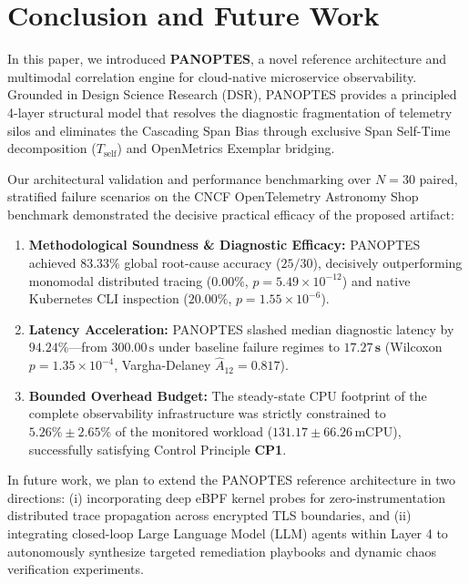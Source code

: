 \section{Conclusion and Future Work}
\label{sec:conclusion}

In this paper, we introduced \textbf{PANOPTES}, a novel reference architecture and multimodal correlation engine for cloud-native microservice observability. Grounded in Design Science Research (DSR), PANOPTES provides a principled 4-layer structural model that resolves the diagnostic fragmentation of telemetry silos and eliminates the Cascading Span Bias through exclusive Span Self-Time decomposition ($T_{\text{self}}$) and OpenMetrics Exemplar bridging.

Our architectural validation and performance benchmarking over $N=30$ paired, stratified failure scenarios on the CNCF OpenTelemetry Astronomy Shop benchmark demonstrated the decisive practical efficacy of the proposed artifact:
\begin{enumerate}[leftmargin=1.2em, itemsep=2pt, topsep=3pt]
    \item \textbf{Methodological Soundness \& Diagnostic Efficacy:} PANOPTES achieved $\mathbf{83.33\%}$ global root-cause accuracy ($25/30$), decisively outperforming monomodal distributed tracing ($0.00\%$, $p = 5.49 \times 10^{-12}$) and native Kubernetes CLI inspection ($20.00\%$, $p = 1.55 \times 10^{-6}$).
    \item \textbf{Latency Acceleration:} PANOPTES slashed median diagnostic latency by $\mathbf{94.24\%}$—from $300.00\,\text{s}$ under baseline failure regimes to $\mathbf{17.27\,\text{s}}$ (Wilcoxon $p = 1.35 \times 10^{-4}$, Vargha-Delaney $\hat{A}_{12} = 0.817$).
    \item \textbf{Bounded Overhead Budget:} The steady-state CPU footprint of the complete observability infrastructure was strictly constrained to $\mathbf{5.26\% \pm 2.65\%}$ of the monitored workload ($131.17 \pm 66.26\,\text{mCPU}$), successfully satisfying Control Principle \textbf{CP1}.
\end{enumerate}

In future work, we plan to extend the PANOPTES reference architecture in two directions: (i) incorporating deep eBPF kernel probes for zero-instrumentation distributed trace propagation across encrypted TLS boundaries, and (ii) integrating closed-loop Large Language Model (LLM) agents within Layer 4 to autonomously synthesize targeted remediation playbooks and dynamic chaos verification experiments.

